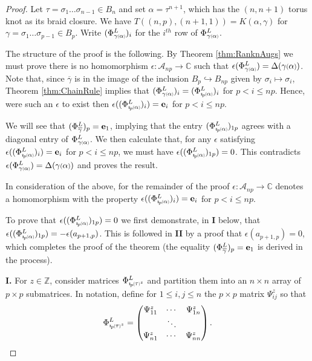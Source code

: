 \documentclass[11pt]{amsart}
\def\Z{{\mathbb Z}}
\def\C{{\mathbb C}}
\def\A{{\mathcal A}}
\def\s{{\sigma}}
\newcommand*{\smallp}[1]{\scalebox{.75}{\ensuremath#1}}
\newcommand*{\subsmallp}[1]{\scalebox{.5}{\ensuremath#1}}
\newcommand{\subpp}[2][p]{\imath_{\hspace*{-1pt}#1}\hspace*{-.5pt}\subsmallp(#2\subsmallp)}
\theoremstyle{definition}
\begin{document}
\begin{proof}
Let $\tau = \s_1\ldots\s_{n-1}\in B_n$ and set $\alpha = \tau^{n+1}$, which has the $(n,n+1)$ torus knot as its braid closure. We have $T((n,p),(n+1,1)) = K(\alpha,\gamma)$ for $\gamma=\s_1\ldots\s_{p-1}\in B_p$. Write $(\Phi_{\gamma\subsmallp(\alpha\subsmallp)}^L)_i$ for the $i^{th}$ row of $\Phi_{\gamma\subsmallp(\alpha\subsmallp)}^L$.

The structure of the proof is the following. By Theorem \ref{thm:RanknAugs} we must prove there is no homomorphism $\epsilon:\A_{np}\to\C$ such that $\epsilon(\Phi_{\gamma\subsmallp(\alpha\subsmallp)}^L)=\Delta(\gamma\smallp(\alpha\smallp))$. Note that, since $\overline\gamma$ is in the image of the inclusion $B_p\hookrightarrow B_{np}$ given by $\s_i\mapsto\s_i$, Theorem \ref{thm:ChainRule} implies that $(\Phi_{\gamma\subsmallp(\alpha\subsmallp)}^L)_i=(\Phi_{\subpp\alpha}^L)_i$ for $p<i\le np$. Hence, were such an $\epsilon$ to exist then $\epsilon((\Phi_{\subpp\alpha}^L)_i) = {\bf e}_{i}$ for $p < i \le np$. 

We will see that $(\Phi_{\overline\gamma}^L)_p={\bf e}_1$, implying that the entry $(\Phi_{\subpp\alpha}^L)_{1p}$ agrees with a diagonal entry of $\Phi_{\gamma\subsmallp(\alpha\subsmallp)}^L$. We then calculate that, for any $\epsilon$ satisfying $\epsilon((\Phi_{\subpp\alpha}^L)_i) = {\bf e}_{i}$ for $p < i \le np$, we must have $\epsilon((\Phi_{\subpp\alpha}^L)_{1p})=0$. This contradicts $\epsilon(\Phi_{\gamma\subsmallp(\alpha\subsmallp)}^L) = \Delta(\gamma\smallp(\alpha\smallp))$ and proves the result.

In consideration of the above, for the remainder of the proof $\epsilon:\A_{np}\to\C$ denotes a homomorphism with the property $\epsilon((\Phi_{\subpp\alpha}^L)_i) = {\bf e}_{i}$ for $p < i \le np$.

To prove that $\epsilon((\Phi_{\subpp\alpha}^L)_{1p})=0$ we first demonstrate, in {\bf I} below, that $\epsilon((\Phi_{\subpp\alpha}^L)_{1p})=-\epsilon(a_{p+1,p})$. This is followed in {\bf II} by a proof that $\epsilon(a_{p+1,p})=0$, which completes the proof of the theorem (the equality $(\Phi_{\overline\gamma}^L)_p={\bf e}_1$ is derived in the process).

{\bf I.} For $z\in\Z$, consider matrices $\Phi_{\subpp\tau^z}^L$ and partition them into an $n\times n$ array of $p\times p$ submatrices. In notation, define for $1\le i,j\le n$ the $p\times p$ matrix $\Psi_{ij}^z$ so that
    \[ \Phi_{\subpp\tau^z}^L = \begin{pmatrix}\Psi_{11}^z & \cdots & \Psi_{1n}^z \\ & \ddots & \\ \Psi_{n1}^z & \cdots & \Psi_{nn}^z\end{pmatrix}.\]


\end{proof}
\end{document}
